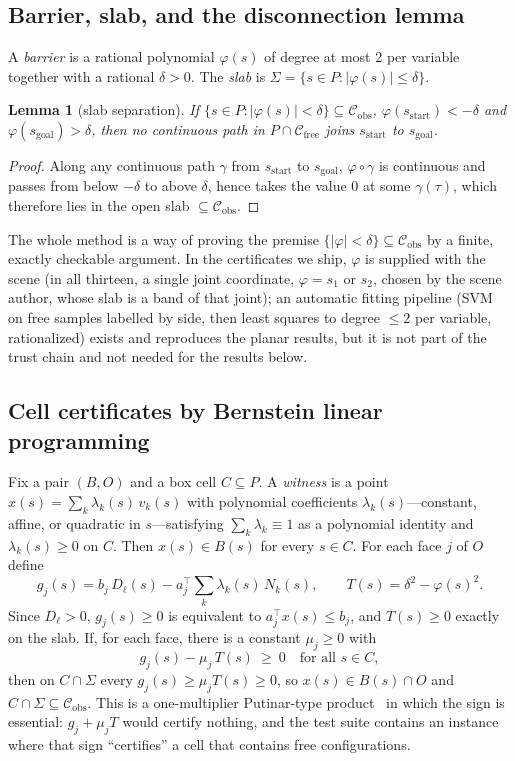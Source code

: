 \documentclass[10pt,twocolumn,letterpaper]{article}
\newtheorem{lemma}{Lemma}
\newcommand{\Cobs}{\mathcal{C}_{\mathrm{obs}}}
\newcommand{\Cfree}{\mathcal{C}_{\mathrm{free}}}
\newcommand{\vphi}{\varphi}
\newif\ifhl \hlfalse  %
\newcommand{\new}[1]{\ifhl{\color{blue!65!black}#1}\else#1\fi}
\begin{document}
\subsection{Barrier, slab, and the disconnection lemma}
A \emph{barrier} is a rational polynomial $\vphi(s)$ of degree at most 2 per variable together with a rational $\delta>0$. The \emph{slab} is $\Sigma=\{s\in P:|\vphi(s)|\le\delta\}$.

\begin{lemma}[slab separation]\label{lem:slab}
If $\{s\in P:|\vphi(s)|<\delta\}\subseteq\Cobs$, $\vphi(s_{\mathrm{start}})<-\delta$ and $\vphi(s_{\mathrm{goal}})>\delta$, then no continuous path in $P\cap\Cfree$ joins $s_{\mathrm{start}}$ to $s_{\mathrm{goal}}$.
\end{lemma}
\begin{proof}
Along any continuous path $\gamma$ from $s_{\mathrm{start}}$ to $s_{\mathrm{goal}}$, $\vphi\circ\gamma$ is continuous and passes from below $-\delta$ to above $\delta$, hence takes the value 0 at some $\gamma(\tau)$, which therefore lies in the open slab $\subseteq\Cobs$.
\end{proof}

The whole method is a way of proving the premise $\{|\vphi|<\delta\}\subseteq\Cobs$ by a finite, exactly checkable argument. In the certificates we ship, $\vphi$ is supplied with the scene (\new{in all thirteen, a single joint coordinate, $\vphi=s_1$ or $s_2$, chosen by the scene author}, whose slab is a band of that joint); an automatic fitting pipeline (SVM on free samples labelled by side, then least squares to degree $\le2$ per variable, rationalized) exists and reproduces the planar results, but it is not part of the trust chain and not needed for the results below.

\subsection{Cell certificates by Bernstein linear programming}\label{sec:cellcert}
Fix a pair $(B,O)$ and a box cell $C\subseteq P$. A \emph{witness} is a point $x(s)=\sum_k\lambda_k(s)\,v_k(s)$ with polynomial coefficients $\lambda_k(s)$---constant, affine, or quadratic in $s$---satisfying $\sum_k\lambda_k\equiv1$ as a polynomial identity and $\lambda_k(s)\ge0$ on $C$. Then $x(s)\in B(s)$ for every $s\in C$. For each face $j$ of $O$ define
\[
g_j(s)=b_j\,D_\ell(s)-a_j^{\!\top}\!\sum_k\lambda_k(s)\,N_k(s),\qquad T(s)=\delta^2-\vphi(s)^2 .
\]
Since $D_\ell>0$, $g_j(s)\ge0$ is equivalent to $a_j^{\top}x(s)\le b_j$, and $T(s)\ge0$ exactly on the slab. If, for each face, there is a constant $\mu_j\ge0$ with
\begin{equation}\label{eq:putinar}
g_j(s)-\mu_j\,T(s)\ \ge\ 0\quad\text{for all }s\in C,
\end{equation}
then on $C\cap\Sigma$ every $g_j(s)\ge\mu_j T(s)\ge0$, so $x(s)\in B(s)\cap O$ and $C\cap\Sigma\subseteq\Cobs$. This is a one-multiplier Putinar-type product~\cite{putinar1993} in which the sign is essential: $g_j+\mu_jT$ would certify nothing, and the test suite contains an instance where that sign ``certifies'' a cell that contains free configurations.
\end{document}
